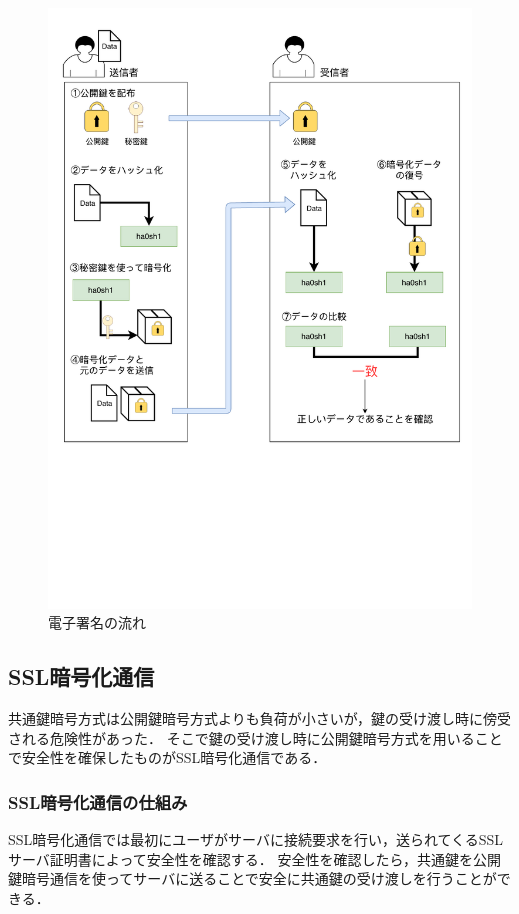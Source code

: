 \documentclass[a4j,12pt]{jsarticle}
\begin{document}
\begin{figure}[H]
\centering
\includegraphics[mediaboxonly=/CropBox,width=12cm]{shomei.pdf}
\caption{電子署名の流れ}
\label{fig:no}
\end{figure} 





\subsection{SSL暗号化通信}
共通鍵暗号方式は公開鍵暗号方式よりも負荷が小さいが，鍵の受け渡し時に傍受される危険性があった．
そこで鍵の受け渡し時に公開鍵暗号方式を用いることで安全性を確保したものがSSL暗号化通信である．

\subsubsection{SSL暗号化通信の仕組み}

SSL暗号化通信では最初にユーザがサーバに接続要求を行い，送られてくるSSLサーバ証明書によって安全性を確認する．
安全性を確認したら，共通鍵を公開鍵暗号通信を使ってサーバに送ることで安全に共通鍵の受け渡しを行うことができる．
\end{document}
